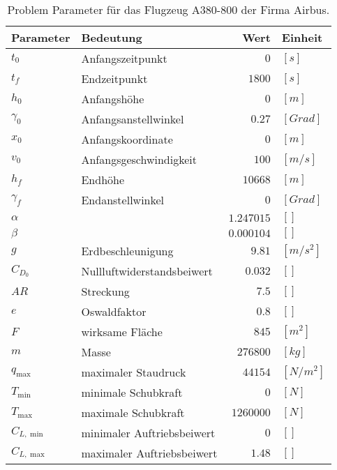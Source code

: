 \begin{table}[H]
    \begin{center}
        \caption{Problem Parameter für das Flugzeug A380-800 der Firma Airbus.}\label{tab:ProblemPara}
        \begin{tabular}{|l|l|r|l|}
            \hline
            Parameter & Bedeutung & Wert & Einheit \\ 
            \hline 
            \hline
            $t_0$ & Anfangszeitpunkt & $0$ & $[s]$ \\ 
            $t_f$ & Endzeitpunkt & $1800$ & $[s]$ \\ 
            \hline
            $h_0$ & Anfangshöhe & $0$ & $[m]$ \\ 
            $\gamma_0$ & Anfangsanstellwinkel & $0.27$ & $[Grad]$ \\
            $x_0$ & Anfangskoordinate & $0$ & $[m]$ \\ 
            $v_0$ & Anfangsgeschwindigkeit & $100$ & $[m/s]$ \\ 
            \hline
            $h_f$ & Endhöhe & $10668$ & $[m]$ \\ 
            $\gamma_f$ & Endanstellwinkel & $0$ & $[Grad]$ \\
            \hline
            $\alpha$ &  & $1.247015$ & $[]$ \\ 
            $\beta$ &  & $0.000104$ & $[]$ \\
            $g$ & Erdbeschleunigung & $9.81$ & $[m/s^2]$ \\ 
            $C_{D_0}$ & Nullluftwiderstandsbeiwert & $0.032$ & $[]$ \\ 
            $AR$ & Streckung & $7.5$ & $[]$ \\ 
            $e$ & Oswaldfaktor & $0.8$ & $[]$ \\ 
            $F$ & wirksame Fläche & $845$ & $[m^2]$ \\ 
            $m$ & Masse & $276800$ & $[kg]$ \\ 
            $q_{\max}$ & maximaler Staudruck & $44154$ & $[N/m^2]$ \\
            $T_{\min}$ & minimale Schubkraft & $0$ & $[N]$ \\  
            $T_{\max}$ & maximale Schubkraft & $1260000$ & $[N]$ \\ 
            $C_{L, \min}$ & minimaler Auftriebsbeiwert & $0$ & $[]$ \\ 
            $C_{L, \max}$ & maximaler Auftriebsbeiwert & $1.48$ & $[]$ \\ 
            \hline
        \end{tabular} 
    \end{center}
\end{table}


